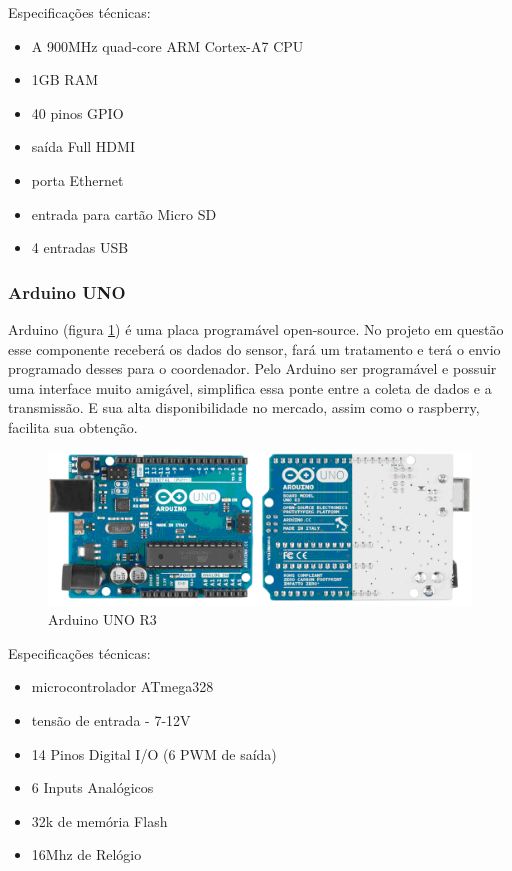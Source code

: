 Especificações técnicas:
\begin{itemize}
\item{A 900MHz quad-core ARM Cortex-A7 CPU}
\item{1GB RAM}
\item{40 pinos GPIO}
\item{saída Full HDMI}
\item{porta Ethernet}
\item{entrada para cartão Micro SD}
\item{4 entradas USB}
\end{itemize}
%
\subsubsection{Arduino UNO}

Arduino (figura \ref{fig:arduino uno}) é uma placa programável open-source. No projeto em questão esse componente receberá os dados do sensor, fará um tratamento e terá o envio programado desses para o coordenador. Pelo Arduino ser programável e possuir uma interface muito amigável, simplifica essa ponte entre a coleta de dados e a transmissão. E sua alta disponibilidade no mercado, assim como o raspberry, facilita sua obtenção.

\begin{figure}[H]
\includegraphics[width=1\textwidth]{figuras/arduino_uno.png}
\caption{\label{fig:arduino uno} Arduino UNO R3}
\end{figure}

Especificações técnicas:
\begin{itemize}
\item{microcontrolador ATmega328}
\item{tensão de entrada - 7-12V}
\item{14 Pinos Digital I/O (6 PWM de saída)}
\item{6 Inputs Analógicos}
\item{32k de memória Flash}
\item{16Mhz de Relógio}
\end{itemize}
%
